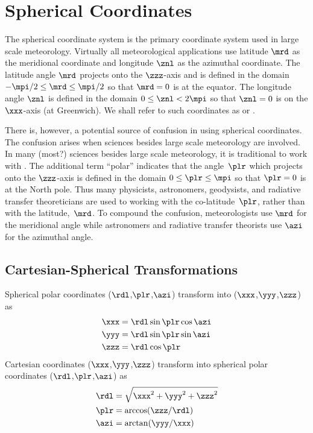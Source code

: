 \documentclass[12pt,twoside]{book}
\begin{document}
\section[Spherical Coordinates]{Spherical Coordinates}\label{sxn:sph}
The spherical coordinate system is the primary coordinate system used
in large scale meteorology.
Virtually all meteorological applications use latitude $\mrd$ as the 
meridional coordinate and longitude $\znl$ as the azimuthal
coordinate. 
The latitude angle $\mrd$ projects onto the $\zzz$-axis and is defined
in the domain $-\mpi/2 \le \mrd \le \mpi/2$ so that $\mrd = 0$ is at the
equator.
The longitude angle $\znl$ is defined in the domain $0 \le \znl <
2\mpi$ so that $\znl = 0$ is on the $\xxx$-axis (at Greenwich).
We shall refer to such coordinates as 
or .

There is, however, a potential source of confusion in using spherical  
coordinates. 
The confusion arises when sciences besides large scale meteorology
are involved.
In many (most?) sciences besides large scale meteorology, it is
traditional to work with .
The additional term ``polar'' indicates that the angle~$\plr$
which projects onto the $\zzz$-axis is defined in the domain 
$0 \le \plr \le \mpi$ so that $\plr = 0$ is at the North pole.
Thus many physicists, astronomers, geodysists, and radiative transfer 
theoreticians are used to working with the co-latitude~$\plr$, rather
than with the latitude,~$\mrd$.
To compound the confusion, meteorologists use $\mrd$ for the
meridional angle while astronomers and radiative transfer theorists
use $\azi$ for the azimuthal angle.

\subsection[Cartesian-Spherical Transormations]{Cartesian-Spherical Transformations}\label{sxn:crt_sph}
Spherical polar coordinates ($\rdl$,$\plr$,$\azi$) transform into
 ($\xxx$,$\yyy$,$\zzz$) as
\begin{subequations}
\begin{align}
\xxx & = \rdl\sin\plr\cos\azi \\
\yyy & = \rdl\sin\plr\sin\azi \\
\zzz & = \rdl\cos\plr
\label{eqn:sph_crt_trn}
\end{align}
\end{subequations}
Cartesian coordinates ($\xxx$,$\yyy$,$\zzz$) transform into
spherical polar coordinates ($\rdl$,$\plr$,$\azi$) as
\begin{subequations}
\begin{align}
\rdl & = \sqrt{\xxx^{2}+\yyy^{2}+\zzz^{2}} \\
\plr & = \arccos(\zzz/\rdl) \\
\azi & = \arctan(\yyy/\xxx)
\label{eqn:crt_sph_trn}
\end{align}
\end{subequations}
\end{document}
